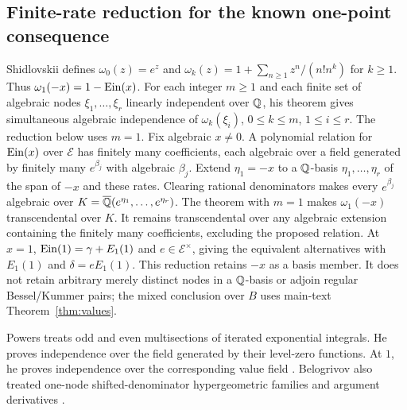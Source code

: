 \subsection*{Finite-rate reduction for the known one-point consequence}
Shidlovskii defines $\omega_0(z)=e^z$ and
$\omega_k(z)=1+\sum_{n\ge1}z^n/(n!n^k)$ for $k\ge1$.
Thus $\omega_1(-x)=1-\operatorname{Ein}(x)$.
For each integer $m\ge1$ and each finite set of algebraic nodes
$\xi_1,\ldots,\xi_r$ linearly independent over $\mathbb{Q}$, his theorem gives
simultaneous algebraic independence of $\omega_k(\xi_i)$,
$0\le k\le m$, $1\le i\le r$. The reduction below uses $m=1$.
Fix algebraic $x\ne0$. A polynomial relation for $\operatorname{Ein}(x)$ over
$\mathcal E$ has finitely many coefficients, each algebraic over a
field generated by finitely many $e^{\beta_j}$ with algebraic $\beta_j$.
Extend $\eta_1=-x$ to a $\mathbb{Q}$-basis $\eta_1,\ldots,\eta_r$ of the
span of $-x$ and these rates.
Clearing rational denominators makes every $e^{\beta_j}$ algebraic
over $K={\overline{\mathbb{Q}}}(e^{\eta_1},\ldots,e^{\eta_r})$.
The theorem with $m=1$ makes $\omega_1(-x)$ transcendental over $K$.
It remains transcendental over any algebraic extension containing the
finitely many coefficients, excluding the proposed relation.
At $x=1$, $\operatorname{Ein}(1)=\gamma+E_1(1)$ and $e\in\mathcal E^\times$,
giving the equivalent alternatives with $E_1(1)$ and $\delta=eE_1(1)$.
This reduction retains $-x$ as a basis member. It does not retain
arbitrary merely distinct nodes in a $\mathbb{Q}$-basis or adjoin regular
Bessel/Kummer pairs; the mixed conclusion over $B$ uses
main-text Theorem~\ref{thm:values}.

Powers treats odd and even multisections of iterated exponential integrals.
He proves independence over the field generated by their level-zero functions.
At $1$, he proves independence over the corresponding value field \cite[p.~13]{Powers2026}.
Belogrivov also treated one-node shifted-denominator hypergeometric
families and argument derivatives \cite{Belogrivov1970}.

